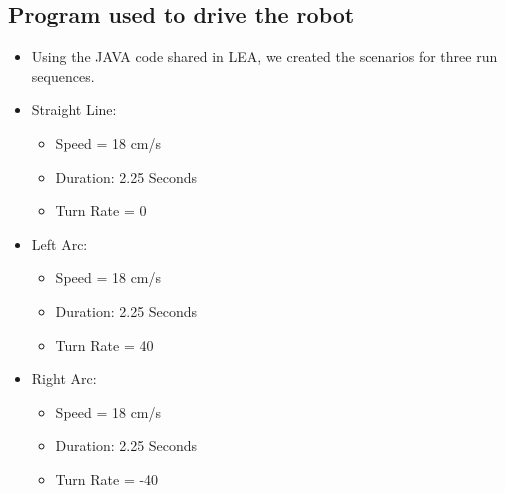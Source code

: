 \documentclass[10pt,a4paper]{article}
\begin{document}
			\subsection{Program used to drive the robot}
				\begin{itemize}
					\item Using the JAVA code shared in LEA, we created the scenarios for three run sequences.
					\item Straight Line:
						\begin{itemize}
							\item Speed = 18 cm/s
							\item Duration: 2.25 Seconds
							\item Turn Rate = 0
						\end{itemize}
					\item Left Arc:
						\begin{itemize}
							\item Speed = 18 cm/s
							\item Duration: 2.25 Seconds
							\item Turn Rate = 40
						\end{itemize}
					\item Right Arc:
						\begin{itemize}
							\item Speed = 18 cm/s
							\item Duration: 2.25 Seconds
							\item Turn Rate = -40
						\end{itemize}							
				\end{itemize}
\end{document}

